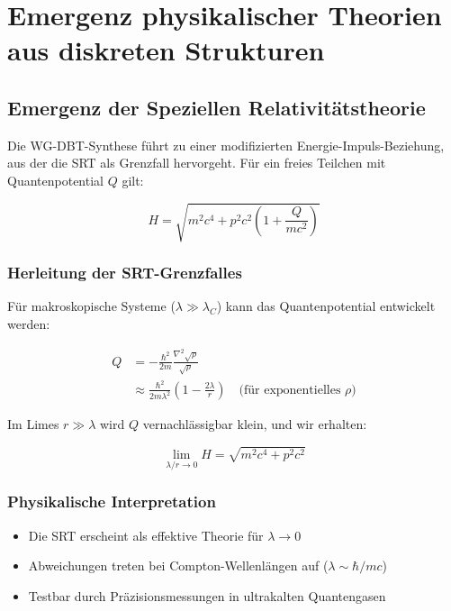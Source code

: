 \section{Emergenz physikalischer Theorien aus diskreten Strukturen}
\label{sec:emergence_discussion}

\subsection{Emergenz der Speziellen Relativitätstheorie}
\label{subsec:srt_emergence}

Die WG-DBT-Synthese führt zu einer modifizierten Energie-Impuls-Beziehung, aus der die SRT als Grenzfall hervorgeht. Für ein freies Teilchen mit Quantenpotential $Q$ gilt:

\begin{equation}
H = \sqrt{m^2c^4 + p^2c^2\left(1 + \frac{Q}{mc^2}\right)}
\end{equation}

\subsubsection{Herleitung der SRT-Grenzfalles}
Für makroskopische Systeme ($\lambda \gg \lambda_C$) kann das Quantenpotential entwickelt werden:

\begin{align}
Q &= -\frac{\hbar^2}{2m}\frac{\nabla^2\sqrt{\rho}}{\sqrt{\rho}} \\
&\approx \frac{\hbar^2}{2m\lambda^2}\left(1 - \frac{2\lambda}{r}\right) \quad \text{(für exponentielles $\rho$)}
\end{align}

Im Limes $r \gg \lambda$ wird $Q$ vernachlässigbar klein, und wir erhalten:

\begin{equation}
\lim_{\lambda/r \to 0} H = \sqrt{m^2c^4 + p^2c^2}
\end{equation}

\subsubsection{Physikalische Interpretation}
\begin{itemize}
\item Die SRT erscheint als effektive Theorie für $\lambda \to 0$
\item Abweichungen treten bei Compton-Wellenlängen auf ($\lambda \sim \hbar/mc$)
\item Testbar durch Präzisionsmessungen in ultrakalten Quantengasen
\end{itemize}

